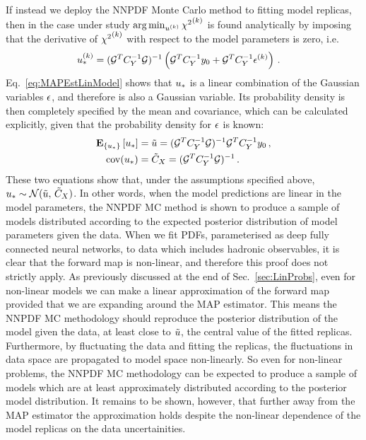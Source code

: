 If instead we deploy the NNPDF Monte Carlo method to fitting model replicas,
then in the case under study $\arg\min_{u^{(k)}} {\chi^2}^{(k)}$ is found
analytically by imposing that the derivative of ${\chi^2}^{(k)}$ with respect to the
model parameters is zero, i.e.
\begin{equation}
    \begin{split}
        \label{eq:MAPEstLinModel}
        u_*^{(k)} &= (\mathcal{G}^T C_{Y}^{-1} \mathcal{G})^{-1}
        \left(
            \mathcal{G}^T C_{Y}^{-1} y_0 +
            \mathcal{G}^T C_{Y}^{-1} \epsilon^{(k)}
        \right) \, .
    \end{split}
\end{equation}
Eq.~\ref{eq:MAPEstLinModel} shows that $u_*$ is a linear combination of
the Gaussian variables $\epsilon$, and therefore is also a Gaussian variable. Its
probability density is then completely specified by the mean and covariance, which can be calculated explicitly, given that the probability
density for $\epsilon$ is known:
\begin{align}
    \mathbf{E}_{\{ u_* \}} \left[ u_* \right] &=
    \tilde{u} = (\mathcal{G}^T C_{Y}^{-1} \mathcal{G})^{-1} \mathcal{G}^T
    C_{Y}^{-1} y_0\, , \\
    {\rm cov}(u_*) &= \tilde{C}_X = (\mathcal{G}^T C_{Y}^{-1} \mathcal{G})^{-1} \, .
\end{align}
These two equations show that, under the assumptions specified above, $u_*
\sim \mathcal{N}(\tilde{u}, \, \tilde{C}_X)$. In other words, when the
model predictions are linear in the model parameters, the NNPDF MC method is
shown to produce a sample of models distributed according to the expected posterior distribution of model
parameters given the data. When we fit PDFs, parameterised as deep fully
connected neural networks, to data which includes hadronic observables, it is
clear that the forward map is non-linear, and therefore this proof does not
strictly apply. As previously discussed at the end of Sec.~\ref{sec:LinProbs},
even for non-linear models we can make a linear approximation of the forward map
provided that we are expanding around the MAP estimator. This means the NNPDF MC
methodology should reproduce the posterior distribution of the model given the
data, at least close to $\tilde{u}$, the central value of the fitted replicas.
Furthermore, by fluctuating the data and fitting the replicas, the fluctuations
in data space are propagated to model space non-linearly. So even for non-linear
problems, the NNPDF MC methodology can be expected to produce a sample of models which are at
least approximately distributed according to the posterior model distribution.
It remains to be shown, however,
that further away from the MAP estimator the approximation holds
despite the non-linear dependence of the model replicas on the data
uncertainities.

